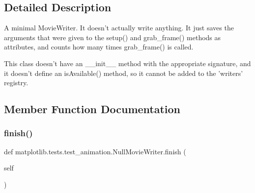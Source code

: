 \subsection{Detailed Description}
\begin{DoxyVerb}A minimal MovieWriter.  It doesn't actually write anything.
It just saves the arguments that were given to the setup() and
grab_frame() methods as attributes, and counts how many times
grab_frame() is called.

This class doesn't have an __init__ method with the appropriate
signature, and it doesn't define an isAvailable() method, so
it cannot be added to the 'writers' registry.
\end{DoxyVerb}
 

\subsection{Member Function Documentation}
\mbox{\label{classmatplotlib_1_1tests_1_1test__animation_1_1NullMovieWriter_ad355baec713b5f1bf70efca30edc95cb}} 
\subsubsection{\texorpdfstring{finish()}{finish()}}
{\footnotesize\ttfamily def matplotlib.\+tests.\+test\+\_\+animation.\+Null\+Movie\+Writer.\+finish (\begin{DoxyParamCaption}\item[{}]{self }\end{DoxyParamCaption})}

\mbox{\label{classmatplotlib_1_1tests_1_1test__animation_1_1NullMovieWriter_abbb41e65d2a20ec535f517e4b5cd642d}} 
